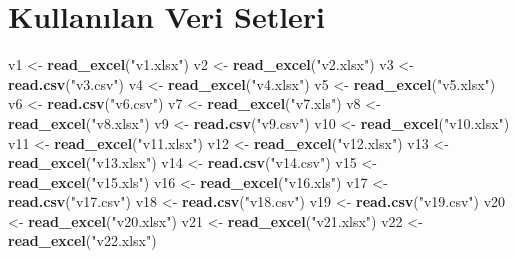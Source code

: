 \documentclass[
]{book}
\newenvironment{Shaded}{\begin{snugshade}}{\end{snugshade}}
\newcommand{\KeywordTok}[1]{\textcolor[rgb]{0.13,0.29,0.53}{\textbf{#1}}}
\newcommand{\NormalTok}[1]{#1}
\newcommand{\StringTok}[1]{\textcolor[rgb]{0.31,0.60,0.02}{#1}}
\begin{document}
\hypertarget{kullanux131lan-veri-setleri}{%
\section{Kullanılan Veri Setleri}\label{kullanux131lan-veri-setleri}}

\begin{Shaded}
\begin{Highlighting}[]
\NormalTok{v1 <-}\StringTok{ }\KeywordTok{read_excel}\NormalTok{(}\StringTok{"v1.xlsx"}\NormalTok{)}
\NormalTok{v2 <-}\StringTok{ }\KeywordTok{read_excel}\NormalTok{(}\StringTok{"v2.xlsx"}\NormalTok{)}
\NormalTok{v3 <-}\StringTok{ }\KeywordTok{read.csv}\NormalTok{(}\StringTok{"v3.csv"}\NormalTok{)}
\NormalTok{v4 <-}\StringTok{ }\KeywordTok{read_excel}\NormalTok{(}\StringTok{"v4.xlsx"}\NormalTok{)}
\NormalTok{v5 <-}\StringTok{ }\KeywordTok{read_excel}\NormalTok{(}\StringTok{"v5.xlsx"}\NormalTok{)}
\NormalTok{v6 <-}\StringTok{ }\KeywordTok{read.csv}\NormalTok{(}\StringTok{"v6.csv"}\NormalTok{)}
\NormalTok{v7 <-}\StringTok{ }\KeywordTok{read_excel}\NormalTok{(}\StringTok{"v7.xls"}\NormalTok{)}
\NormalTok{v8 <-}\StringTok{ }\KeywordTok{read_excel}\NormalTok{(}\StringTok{"v8.xlsx"}\NormalTok{)}
\NormalTok{v9 <-}\StringTok{ }\KeywordTok{read.csv}\NormalTok{(}\StringTok{"v9.csv"}\NormalTok{)}
\NormalTok{v10 <-}\StringTok{ }\KeywordTok{read_excel}\NormalTok{(}\StringTok{"v10.xlsx"}\NormalTok{)}
\NormalTok{v11 <-}\StringTok{ }\KeywordTok{read_excel}\NormalTok{(}\StringTok{"v11.xlsx"}\NormalTok{)}
\NormalTok{v12 <-}\StringTok{ }\KeywordTok{read_excel}\NormalTok{(}\StringTok{"v12.xlsx"}\NormalTok{)}
\NormalTok{v13 <-}\StringTok{ }\KeywordTok{read_excel}\NormalTok{(}\StringTok{"v13.xlsx"}\NormalTok{)}
\NormalTok{v14 <-}\StringTok{ }\KeywordTok{read.csv}\NormalTok{(}\StringTok{"v14.csv"}\NormalTok{)}
\NormalTok{v15 <-}\StringTok{ }\KeywordTok{read_excel}\NormalTok{(}\StringTok{"v15.xls"}\NormalTok{)}
\NormalTok{v16 <-}\StringTok{ }\KeywordTok{read_excel}\NormalTok{(}\StringTok{"v16.xls"}\NormalTok{)}
\NormalTok{v17 <-}\StringTok{ }\KeywordTok{read.csv}\NormalTok{(}\StringTok{"v17.csv"}\NormalTok{)}
\NormalTok{v18 <-}\StringTok{ }\KeywordTok{read.csv}\NormalTok{(}\StringTok{"v18.csv"}\NormalTok{)}
\NormalTok{v19 <-}\StringTok{ }\KeywordTok{read.csv}\NormalTok{(}\StringTok{"v19.csv"}\NormalTok{)}
\NormalTok{v20 <-}\StringTok{ }\KeywordTok{read_excel}\NormalTok{(}\StringTok{"v20.xlsx"}\NormalTok{)}
\NormalTok{v21 <-}\StringTok{ }\KeywordTok{read_excel}\NormalTok{(}\StringTok{"v21.xlsx"}\NormalTok{)}
\NormalTok{v22 <-}\StringTok{ }\KeywordTok{read_excel}\NormalTok{(}\StringTok{"v22.xlsx"}\NormalTok{)}

\end{Highlighting}
\end{Shaded}
\end{document}
